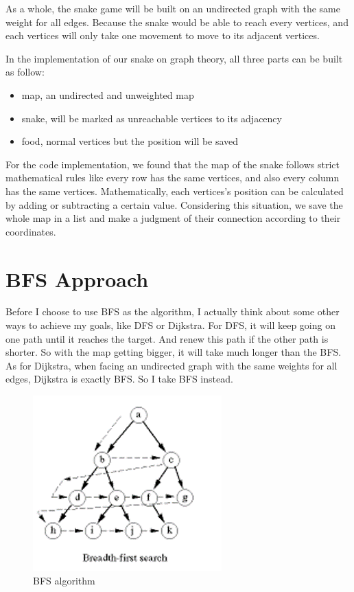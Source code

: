 \documentclass[12pt]{article}
\begin{document}
As a whole, the snake game will be built on an undirected graph with the same weight for all edges. Because the snake would be able to reach every vertices, and each vertices will only take one movement to move to its adjacent vertices.

In the implementation of our snake on graph theory, all three parts can be built as follow:
\begin{itemize}
    \item map, an undirected and unweighted map
    \item snake, will be marked as unreachable vertices to its adjacency
    \item food, normal vertices but the position will be saved
\end{itemize}

For the code implementation, we found that the map of the snake follows strict mathematical rules like every row has the same vertices, and also every column has the same vertices. Mathematically, each vertices's position can be calculated by adding or subtracting a certain value. Considering this situation, we save the whole map in a list and make a judgment of their connection according to their coordinates.

\section{BFS Approach}
Before I choose to use BFS as the algorithm, I actually think about some other ways to achieve my goals, like DFS or Dijkstra. For DFS, it will keep going on one path until it reaches the target. And renew this path if the other path is shorter. So with the map getting bigger, it will take much longer than the BFS. As for Dijkstra, when facing an undirected graph with the same weights for all edges, Dijkstra is exactly BFS. So I take BFS instead.

\begin{figure}[H]
    \centering 
    \includegraphics[scale = 0.8]{1.png}
    \caption{BFS algorithm}
    \label{fig:figure1}
\end{figure}
\end{document}
